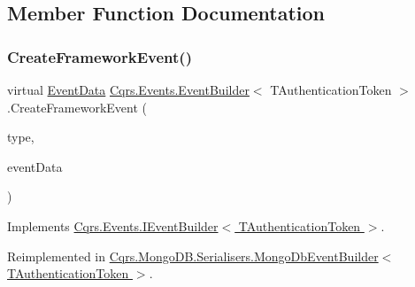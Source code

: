 \subsection{Member Function Documentation}
\mbox{\label{classCqrs_1_1Events_1_1EventBuilder_aa6a794ef27f2795802a4390fd16535f6}} 
\subsubsection{\texorpdfstring{Create\+Framework\+Event()}{CreateFrameworkEvent()}\hspace{0.1cm}{\footnotesize\ttfamily [1/2]}}
{\footnotesize\ttfamily virtual \hyperlink{classCqrs_1_1Events_1_1EventData}{Event\+Data} \hyperlink{classCqrs_1_1Events_1_1EventBuilder}{Cqrs.\+Events.\+Event\+Builder}$<$ T\+Authentication\+Token $>$.Create\+Framework\+Event (\begin{DoxyParamCaption}\item[{string}]{type,  }\item[{\hyperlink{interfaceCqrs_1_1Events_1_1IEvent}{I\+Event}$<$ T\+Authentication\+Token $>$}]{event\+Data }\end{DoxyParamCaption})\hspace{0.3cm}{\ttfamily [virtual]}}



Implements \hyperlink{interfaceCqrs_1_1Events_1_1IEventBuilder_ac77123302de4e79df9661c13219af4d4}{Cqrs.\+Events.\+I\+Event\+Builder$<$ T\+Authentication\+Token $>$}.



Reimplemented in \hyperlink{classCqrs_1_1MongoDB_1_1Serialisers_1_1MongoDbEventBuilder_a06afbb994fd3f679f275dea3d1d60c6e}{Cqrs.\+Mongo\+D\+B.\+Serialisers.\+Mongo\+Db\+Event\+Builder$<$ T\+Authentication\+Token $>$}.

\mbox{\label{classCqrs_1_1Events_1_1EventBuilder_abcc2515f98e4852ab656f1868e7a344c}} 
